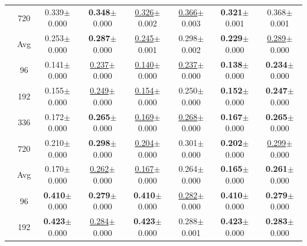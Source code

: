 \begin{table}[t]
{\begin{tabular}{c|c|cc|cc|cc}
 & 720 & 0.339{\scriptsize$\pm$0.000} & \textbf{0.348}{\scriptsize$\pm$0.000} & \underline{0.326}{\scriptsize$\pm$0.002} & \underline{0.366}{\scriptsize$\pm$0.003} & \textbf{0.321}{\scriptsize$\pm$0.001} & 0.368{\scriptsize$\pm$0.001} \\
\cmidrule(lr){2-8}
 & Avg & 0.253{\scriptsize$\pm$0.000} & \textbf{0.287}{\scriptsize$\pm$0.000} & \underline{0.245}{\scriptsize$\pm$0.001} & 0.298{\scriptsize$\pm$0.002} & \textbf{0.229}{\scriptsize$\pm$0.000} & \underline{0.289}{\scriptsize$\pm$0.000} \\
\midrule
{} & 96 & 0.141{\scriptsize$\pm$0.000} & \underline{0.237}{\scriptsize$\pm$0.000} & \underline{0.140}{\scriptsize$\pm$0.000} & \underline{0.237}{\scriptsize$\pm$0.000} & \textbf{0.138}{\scriptsize$\pm$0.000} & \textbf{0.234}{\scriptsize$\pm$0.000} \\
 & 192 & 0.155{\scriptsize$\pm$0.000} & \underline{0.249}{\scriptsize$\pm$0.000} & \underline{0.154}{\scriptsize$\pm$0.000} & 0.250{\scriptsize$\pm$0.000} & \textbf{0.152}{\scriptsize$\pm$0.000} & \textbf{0.247}{\scriptsize$\pm$0.000} \\
 & 336 & 0.172{\scriptsize$\pm$0.000} & \textbf{0.265}{\scriptsize$\pm$0.000} & \underline{0.169}{\scriptsize$\pm$0.000} & \underline{0.268}{\scriptsize$\pm$0.000} & \textbf{0.167}{\scriptsize$\pm$0.000} & \textbf{0.265}{\scriptsize$\pm$0.000} \\
 & 720 & 0.210{\scriptsize$\pm$0.000} & \textbf{0.298}{\scriptsize$\pm$0.000} & \underline{0.204}{\scriptsize$\pm$0.000} & 0.301{\scriptsize$\pm$0.000} & \textbf{0.202}{\scriptsize$\pm$0.000} & \underline{0.299}{\scriptsize$\pm$0.000} \\
\cmidrule(lr){2-8}
 & Avg & 0.170{\scriptsize$\pm$0.000} & \underline{0.262}{\scriptsize$\pm$0.000} & \underline{0.167}{\scriptsize$\pm$0.000} & 0.264{\scriptsize$\pm$0.000} & \textbf{0.165}{\scriptsize$\pm$0.000} & \textbf{0.261}{\scriptsize$\pm$0.000} \\
\midrule
{} & 96 & \textbf{0.410}{\scriptsize$\pm$0.000} & \textbf{0.279}{\scriptsize$\pm$0.000} & \textbf{0.410}{\scriptsize$\pm$0.000} & \underline{0.282}{\scriptsize$\pm$0.000} & \textbf{0.410}{\scriptsize$\pm$0.000} & \textbf{0.279}{\scriptsize$\pm$0.000} \\
 & 192 & \textbf{0.423}{\scriptsize$\pm$0.000} & \underline{0.284}{\scriptsize$\pm$0.000} & \textbf{0.423}{\scriptsize$\pm$0.000} & 0.288{\scriptsize$\pm$0.001} & \textbf{0.423}{\scriptsize$\pm$0.000} & \textbf{0.283}{\scriptsize$\pm$0.000} \\

\end{tabular}}
\end{table}
